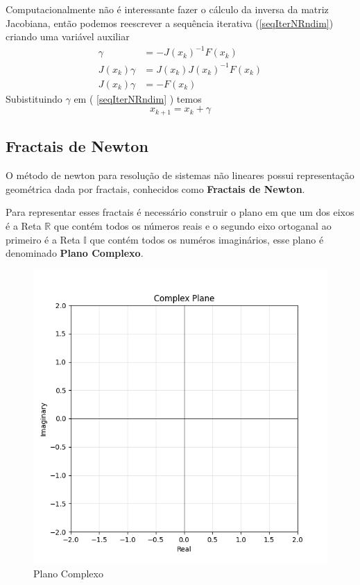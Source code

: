 Computacionalmente não é interessante fazer o cálculo da inversa da matriz Jacobiana, então podemos reescrever a sequência iterativa (\ref{seqIterNRndim}) criando uma variável auxiliar
\begin{align*}
    \gamma &= - J(x_k)^{-1} F(x_k) \\
    J(x_k) \gamma &= J(x_k) J(x_k)^{-1} F(x_k) \\
    J(x_k) \gamma &= - F(x_k) \label{auxNRndim}
\end{align*}
Subistituindo $\gamma$ em ( \ref{seqIterNRndim} ) temos
\begin{equation*}
    x_{k+1} = x_k + \gamma
\end{equation*}


\subsection{Fractais de Newton}
O método de newton para resolução de sistemas não lineares possui representação geométrica dada por fractais, conhecidos como \textbf{Fractais de Newton}.

Para representar esses fractais é necessário construir o plano em que um dos eixos é a Reta $\mathbb{R}$ que contém todos os números reais e o segundo eixo ortoganal ao primeiro é a Reta $\mathbb{I}$ que contém todos os numéros imaginários, esse plano é denominado \textbf{Plano Complexo}.

\begin{figure}[H]
    \centering
    \includegraphics[width=1\textwidth]{Imagens/complexPlane/complex_plane_axes.png}
    \caption{Plano Complexo}
    \label{fig:complexPlane}
\end{figure}

